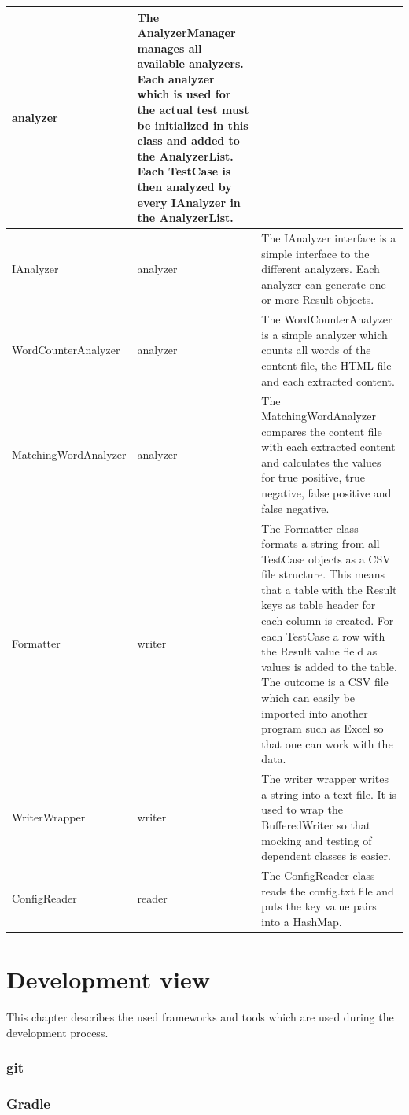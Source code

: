 \begin{longtable}{p{4cm}|p{2cm}|p{8cm}}
analyzer &          
The AnalyzerManager manages all available analyzers. Each analyzer which is used for the actual test must be initialized in this class and added to the AnalyzerList. Each TestCase is then analyzed by every IAnalyzer in the AnalyzerList.
\\ \hline
IAnalyzer &
analyzer &
The IAnalyzer interface is a simple interface to the different analyzers. Each analyzer can generate one or more Result objects.
\\ \hline
WordCounterAnalyzer &
analyzer &
The WordCounterAnalyzer is a simple analyzer which counts all words of the content file, the HTML file and each extracted content.
\\ \hline
MatchingWordAnalyzer &
analyzer &
The MatchingWordAnalyzer compares the content file with each extracted content and calculates the values for true positive, true negative, false positive and false negative.
\\ \hline
Formatter &           
writer &           
The Formatter class formats a string from all TestCase objects as a CSV file structure. This means that a table with the Result keys as table header for each column is created. For each TestCase a row with the Result value field as values is added to the table. The outcome is a CSV file which can easily be imported into another program such as Excel so that one can work with the data.
\\ \hline
WriterWrapper &
writer &
The writer wrapper writes a string into a text file. It is used to wrap the BufferedWriter so that mocking and testing of dependent classes is easier.
\\ \hline
ConfigReader &
reader &
The ConfigReader class reads the config.txt file and puts the key value pairs into a HashMap.
\\ \hline
\end{longtable}


\section{Development view}

This chapter describes the used frameworks and tools which are used during the development process.

\subsubsection{git}
\subsubsection{Gradle}
